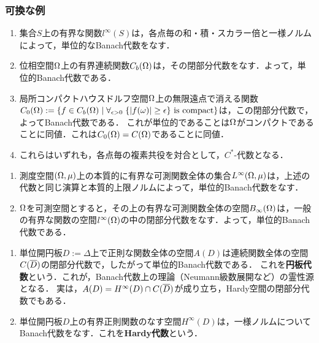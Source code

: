 \documentclass[uplatex,dvipdfmx]{jsreport}
\begin{document}
\subsubsection{可換な例}

\begin{example}[位相空間上の関数の代数]\mbox{}
    \begin{enumerate}
        \item 集合$S$上の有界な関数$l^\infty(S)$は，各点毎の和・積・スカラー倍と一様ノルムによって，単位的なBanach代数をなす．
        \item 位相空間$\Omega$上の有界連続関数$C_b(\Omega)$は，その閉部分代数をなす．よって，単位的Banach代数である．
        \item 局所コンパクトハウスドルフ空間$\Omega$上の無限遠点で消える関数$C_0(\Omega):=\left\{f\in C_b(\Omega)\mid\forall_{\epsilon>0}\;\{\lvert f(\omega)\rvert\ge\epsilon\}\text{ is compact}\right\}$は，この閉部分代数で，よってBanach代数である．
        これが単位的であることは$\Omega$がコンパクトであることに同値．これは$C_0(\Omega)=C(\Omega)$であることに同値．
        \item これらはいずれも，各点毎の複素共役を対合として，$C^*$-代数となる．
    \end{enumerate}
\end{example}

\begin{example}[可測関数の代数]\mbox{}
    \begin{enumerate}
        \item 測度空間$(\Omega,\mu)$上の本質的に有界な可測関数全体の集合$L^\infty(\Omega,\mu)$は，上述の代数と同じ演算と本質的上限ノルムによって，単位的Banach代数をなす．
        \item $\Omega$を可測空間とすると，その上の有界な可測関数全体の空間$B_\infty(\Omega)$は，一般の有界な関数の空間$l^\infty(\Omega)$の中の閉部分代数をなす．よって，単位的Banach代数である．
    \end{enumerate}
\end{example}

\begin{example}\mbox{}
    \begin{enumerate}
        \item 単位開円板$D:=\Delta$上で正則な関数全体の空間$A(D)$は連続関数全体の空間$C(\overline{D})$の閉部分代数で，したがって単位的Banach代数である．
        これを\textbf{円板代数}という．これが，Banach代数上の理論（Neumann級数展開など）の霊性源となる．
        実は，$A(D)=H^\infty(D)\cap C(\overline{D})$が成り立ち，Hardy空間の閉部分代数でもある．
        \item 単位開円板$D$上の有界正則関数のなす空間$H^\infty(D)$は，一様ノルムについてBanach代数をなす．これを\textbf{Hardy代数}という．
    \end{enumerate}
\end{example}
\end{document}
